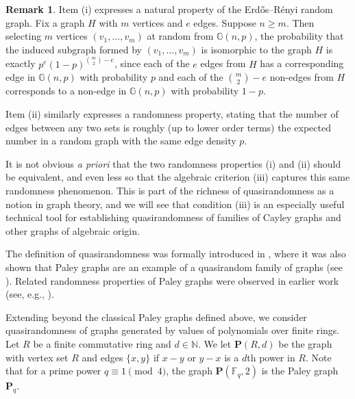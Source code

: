 \documentclass{amsart}
\theoremstyle{definition}
\newtheorem{remark}[theorem]{Remark}
\numberwithin{equation}{section}
\newcommand{\N}{\mathbb{N}}
\newcommand{\F}{\mathbb{F}}
\newcommand{\bfP}{\mathbf{P}}
\begin{document}
\begin{remark}
    Item (i) expresses a natural property of the Erd\H{o}s--R\'{e}nyi random graph.
    Fix a graph $H$ with $m$ vertices and $e$ edges.
    Suppose $n \ge m$.
    Then selecting $m$ vertices $(v_1, \dots, v_m)$ at random from $\mathbb{G}(n,p)$, the probability that the induced subgraph formed by $(v_1, \dots, v_m)$ is isomorphic to the graph $H$ is exactly $p^e (1-p)^{\binom{m}{2}-e}$, since each of the $e$ edges from $H$ has a corresponding edge in $\mathbb{G}(n,p)$ with probability $p$ and each of the $\binom{m}{2}-e$ non-edges from $H$ corresponds to a non-edge in $\mathbb{G}(n,p)$ with probability $1-p$.

    Item (ii) similarly expresses a randomness property, stating that the number of edges between any two sets is roughly (up to lower order terms) the expected number in a random graph with the same edge density $p$.

    It is not obvious \emph{a priori} that the two randomness properties (i) and (ii) should be equivalent, and even less so that the algebraic criterion (iii) captures this same randomness phenomenon.
    This is part of the richness of quasirandomness as a notion in graph theory, and we will see that condition (iii) is an especially useful technical tool for establishing quasirandomness of families of Cayley graphs and other graphs of algebraic origin.
\end{remark}

The definition of quasirandomness was formally introduced in \cite{cgw}, where it was also shown that Paley graphs are an example of a quasirandom family of graphs (see \cite[Section 5]{cgw}).
Related randomness properties of Paley graphs were observed in earlier work (see, e.g., \cite[Theorem 3]{bt}).

Extending beyond the classical Paley graphs defined above, we consider quasirandomness of graphs generated by values of polynomials over finite rings.
Let $R$ be a finite commutative ring and $d \in \N$.
We let $\bfP(R,d)$ be the graph with vertex set $R$ and edges $\{x,y\}$ if $x-y$ or $y-x$ is a $d$th power in $R$.
Note that for a prime power $q \equiv 1 \pmod{4}$, the graph $\bfP(\F_q,2)$ is the Paley graph $\bfP_q$.
\end{document}
